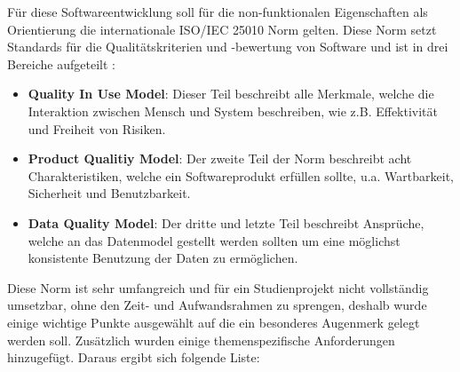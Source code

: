 \vspace{0.25cm}

Für diese Softwareentwicklung soll für die non-funktionalen Eigenschaften als Orientierung die internationale ISO/IEC 25010 Norm gelten. Diese Norm setzt Standards für die Qualitätskriterien und -bewertung von Software und ist in drei Bereiche aufgeteilt\cite{ISO.2011} \cite{Braun.2016}:

\begin{itemize}
	\item \textbf{Quality In Use Model}: Dieser Teil beschreibt alle Merkmale, welche die Interaktion zwischen Mensch und System beschreiben, wie z.B. Effektivität und Freiheit von Risiken.
	\item \textbf{Product Qualitiy Model}: Der zweite Teil der Norm beschreibt acht Charakteristiken, welche ein Softwareprodukt erfüllen sollte, u.a. Wartbarkeit, Sicherheit und Benutzbarkeit.
	\item \textbf{Data Quality Model}: Der dritte und letzte Teil beschreibt Ansprüche, welche an das Datenmodel gestellt werden sollten um eine möglichst konsistente Benutzung der Daten zu ermöglichen.
\end{itemize}

Diese Norm ist sehr umfangreich und für ein Studienprojekt nicht vollständig umsetzbar, ohne den Zeit- und Aufwandsrahmen zu sprengen, deshalb wurde einige wichtige Punkte ausgewählt auf die ein besonderes Augenmerk gelegt werden soll. Zusätzlich wurden einige themenspezifische Anforderungen hinzugefügt. Daraus ergibt sich folgende Liste:

